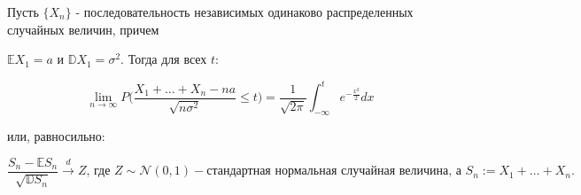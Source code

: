 \begin{theorem*}
    Пусть $\{X_n\}$ - последовательность независимых одинаково распределенных случайных величин, причем
    
    $\mathbb{E}X_1 = a$ и $\mathbb{D}X_1 = \sigma^2$. Тогда для всех $t$:
    
    $$ \lim_{n \to \infty} P \Big( \frac{X_1 + \ldots + X_n - na}{\sqrt{n\sigma^2}} \leq t \Big) = \frac{1}{\sqrt{2\pi}} \int^{t}_{-\infty} e^{-\frac{x^2}{2}} dx $$
    
    или, равносильно:
    
    $$ \frac{S_n - \mathbb{E}S_n}{\sqrt{\mathbb{D}S_n}} \xrightarrow{d} Z \textrm{, где } Z \sim \mathcal{N}(0, 1) - \textrm{стандартная нормальная случайная величина, а } S_n := X_1 + \ldots + X_n \textrm{.} $$
\end{theorem*}
